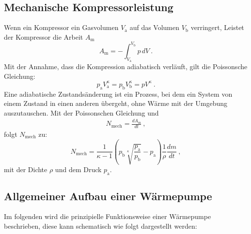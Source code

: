 \subsection{Mechanische Kompressorleistung}
Wenn ein Kompressor ein Gasvolumen $V_\text{a}$ auf das Volumen $V_\text{b}$ verringert, Leistet der Kompressor die Arbeit $A_\text{m}$
\begin{equation}
	A_\text{m} = - \int_{V_\text{a}}^{V_\text{b}} p \, dV \ .
\end{equation}
Mit der Annahme, dass die Kompression adiabatisch verläuft, gilt die Poissonsche Gleichung:
\begin{equation}
	p_\text{a} V_\text{a}^\kappa = p_\text{b} V_\text{b}^\kappa = p V^\kappa \ .
\end{equation}
Eine adiabatische Zustandsänderung ist ein Prozess, bei dem ein System von einem Zustand in einen anderen übergeht, ohne Wärme mit der Umgebung auszutauschen.
Mit der Poissonschen Gleichung und
\begin{align*}
	N_\text{mech} = \frac{dA_\text{m}}{dt} \ ,
\end{align*}
folgt $N_\text{mech}$ zu:
\begin{equation}
	N_\text{mech} = \frac{1}{\kappa - 1} \left(p_\text{b} \sqrt[\kappa]{\frac{p_\text{a}}{p_\text{b}}} - p_\text{a} \right) \frac{1}{\rho} \frac{dm}{dt} \ ,
\end{equation}
mit der Dichte $\rho$ und dem Druck $p_\text{a}$.

\subsection{Allgemeiner Aufbau einer Wärmepumpe}
Im folgenden wird die prinzipielle Funktionsweise einer Wärmepumpe beschrieben, diese kann schematisch wie folgt dargestellt werden:



